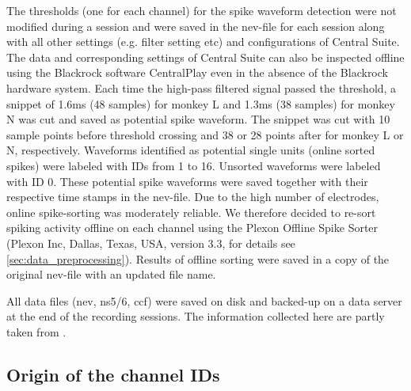 {The thresholds (one for each channel) for the spike waveform detection were not modified during a session and were saved in the nev-file for each session along with all other settings (e.g. filter setting etc) and configurations of Central Suite. The data and corresponding settings of Central Suite can also be inspected offline using the Blackrock software CentralPlay even in the absence of the Blackrock hardware system. Each time the high-pass filtered signal passed the threshold, a snippet of 1.6ms (48 samples) for monkey L and 1.3ms (38 samples) for monkey N was cut and saved as potential spike waveform. The snippet was cut with 10 sample points before threshold crossing and 38 or 28 points after for monkey L or N, respectively. Waveforms identified as potential single units (online sorted spikes) were labeled with IDs from 1 to 16. Unsorted waveforms were labeled with ID 0. These potential spike waveforms were saved together with their respective time stamps in the nev-file. Due to the high number of electrodes, online spike-sorting was moderately reliable. We therefore decided to re-sort spiking activity offline on each channel using the Plexon Offline Spike Sorter (Plexon Inc, Dallas, Texas, USA, version 3.3, for details see \cref{sec:data_preprocessing}). Results of offline sorting were saved in a copy of the original nev-file with an updated file name. 

All data files (nev, ns5/6, ccf) were saved on disk and backed-up on a data server at the end of the recording sessions. The information collected here are partly taken from \citep{Riehle_2013, Zehl_2016}.


\subsection{Origin of the channel IDs}
\label{sec:channel_ids}

}
